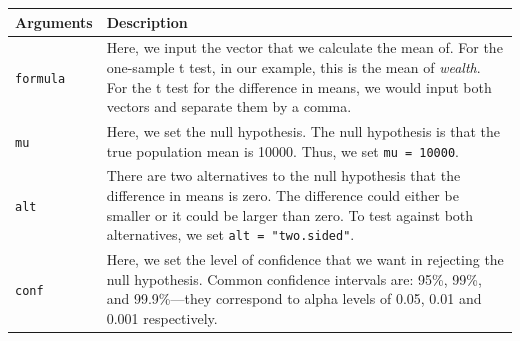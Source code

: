 \documentclass[]{article}
\theoremstyle{definition}
\theoremstyle{definition}
\theoremstyle{definition}
\theoremstyle{remark}
\begin{document}
\begin{longtable}[]{@{}ll@{}}
\toprule
\begin{minipage}[b]{0.12\columnwidth}\raggedright\strut
Arguments\strut
\end{minipage} & \begin{minipage}[b]{0.78\columnwidth}\raggedright\strut
Description\strut
\end{minipage}\tabularnewline
\midrule
\endhead
\begin{minipage}[t]{0.12\columnwidth}\raggedright\strut
\texttt{formula}\strut
\end{minipage} & \begin{minipage}[t]{0.78\columnwidth}\raggedright\strut
Here, we input the vector that we calculate the mean of. For the
one-sample t test, in our example, this is the mean of \emph{wealth}.
For the t test for the difference in means, we would input both vectors
and separate them by a comma.\strut
\end{minipage}\tabularnewline
\begin{minipage}[t]{0.12\columnwidth}\raggedright\strut
\texttt{mu}\strut
\end{minipage} & \begin{minipage}[t]{0.78\columnwidth}\raggedright\strut
Here, we set the null hypothesis. The null hypothesis is that the true
population mean is 10000. Thus, we set \texttt{mu\ =\ 10000}.\strut
\end{minipage}\tabularnewline
\begin{minipage}[t]{0.12\columnwidth}\raggedright\strut
\texttt{alt}\strut
\end{minipage} & \begin{minipage}[t]{0.78\columnwidth}\raggedright\strut
There are two alternatives to the null hypothesis that the difference in
means is zero. The difference could either be smaller or it could be
larger than zero. To test against both alternatives, we set
\texttt{alt\ =\ "two.sided"}.\strut
\end{minipage}\tabularnewline
\begin{minipage}[t]{0.12\columnwidth}\raggedright\strut
\texttt{conf}\strut
\end{minipage} & \begin{minipage}[t]{0.78\columnwidth}\raggedright\strut
Here, we set the level of confidence that we want in rejecting the null
hypothesis. Common confidence intervals are: 95\%, 99\%, and
99.9\%---they correspond to alpha levels of 0.05, 0.01 and 0.001
respectively.\strut
\end{minipage}\tabularnewline
\bottomrule
\end{longtable}
\end{document}
